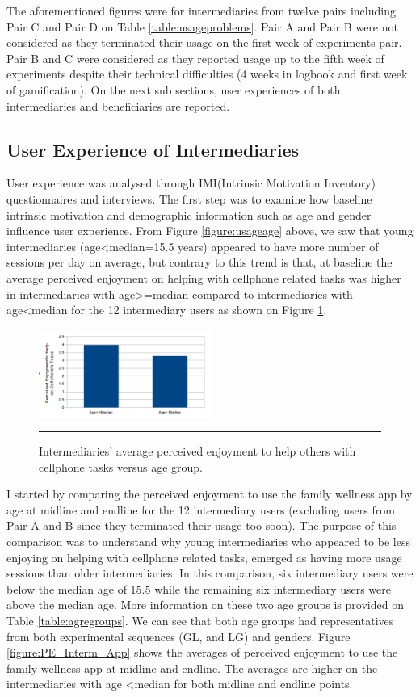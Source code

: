 The aforementioned figures were for intermediaries from twelve pairs including Pair C and Pair D on Table \ref{table:usageproblems}. Pair A and Pair B were not considered as they terminated their usage on the first week of experiments pair. Pair B and C were considered as they reported usage up to the fifth week of experiments despite their technical difficulties (4 weeks in logbook and first week of gamification). On the next sub sections, user experiences of both intermediaries and beneficiaries are reported.
\subsection{User Experience of Intermediaries}
User experience was analysed through IMI(Intrinsic Motivation Inventory) questionnaires and interviews. The first step was to examine how baseline intrinsic motivation and  demographic information such as age and gender influence user experience. From Figure \ref{figure:usageage} above, we saw that young intermediaries (age\textless median=15.5 years) appeared to have more number of sessions per day on average, but contrary to this trend is that, at baseline the average perceived enjoyment on helping with cellphone related tasks was higher in intermediaries with age\textgreater=median compared to intermediaries with age\textless median for the 12 intermediary users as shown on Figure \ref{figure:PE_HELP_Age}. 
\begin{figure}[htbp]
  \centering
    \includegraphics[width=0.5\textwidth]{Figures/PE_HELP_Age.png}
    \rule{35em}{0.5pt}
  \caption{Intermediaries' average perceived enjoyment to help others with cellphone tasks versus age group.}
  \label{figure:PE_HELP_Age}
\end{figure}\newline
I started by comparing the perceived enjoyment to use the family wellness app by age at midline and endline for the 12 intermediary users (excluding users from Pair A and B since they terminated their usage too soon). The purpose of this comparison was to understand why young intermediaries who appeared to be less enjoying on helping with cellphone related tasks, emerged as having more usage sessions than older intermediaries. In this comparison, six intermediary users were below the median age of 15.5 while the remaining six intermediary users were above the median age. More information on these two age groups is provided on Table \ref{table:agregroups}. We can see that both age groups had representatives from both experimental sequences (GL, and LG)  and genders. Figure \ref{figure:PE_Interm_App} shows the averages of perceived enjoyment to use the family wellness app at midline and endline. The averages are higher on the intermediaries with age \textless median for both midline and endline points. \newline
